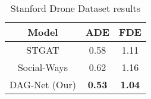 \documentclass[10pt,a4paper,conference]{IEEEtran}
\begin{document}
\begin{table}[!t]
    \renewcommand{\arraystretch}{1.3}
    \centering
    \caption{Stanford Drone Dataset results}
    \label{sdd_results}
    \begin{tabular}{c|cc}
        \hline
        \textbf{Model} & \textbf{ADE} & \textbf{FDE}\\
        \hline \hline
             STGAT \cite{stgat} & 0.58 & 1.11\\
             Social-Ways \cite{socialways} & 0.62 & 1.16\\      
             DAG-Net (Our) & \textbf{0.53} & \textbf{1.04}\\
        \hline
    \end{tabular}
\end{table}


\begin{comment}
\begin{table}[!t]
    \renewcommand{\arraystretch}{1.3}
    \centering
    \caption{Basketball SportVU results}
     \label{sportvu_results}
    \begin{tabular}{c|c|cc}
        \hline
        \textbf{Team} & \textbf{Model} & \textbf{ADE} & \textbf{FDE}\\
        \hline \hline
                \multirow{4}{*}{ATK}&STGAT \cite{stgat} & 9.94 & 15.80\\
                & Social-Ways \cite{socialways} & 9.91 & 15.19\\
                & Weak-Supervision \cite{weeksup} & 9.47 & 16.98\\
                & DAG-Net (Our) & \textbf{9.18} & \textbf{13.54}\\
        \hline
                \multirow{4}{*}{DEF}&STGAT \cite{stgat} & 7.26 & 11.28\\
                & Social-Ways \cite{socialways} & 7.31 & 10.21\\
                & Weak-Supervision \cite{weeksup} & 7.05 & 10.56\\
                & DAG-Net (Our) & \textbf{7.01} & \textbf{9.76}\\
        \hline
    \end{tabular}
\end{table}


\end{comment}
\end{document}

